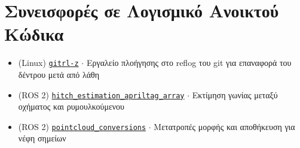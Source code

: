 \documentclass[a4paper,10pt,twoside]{article}
\begin{document}
\verticalspacebetweensections

\section{\textbf{Συνεισφορές σε Λογισμικό Ανοικτού Κώδικα}}\verticalspacebetweensectionandcontent

  \noindent\begin{minipage}[t]{\textwidth}
    \begin{itemize}
      \item (Linux) \href{https://github.com/li9i/gitrl-z}{\texttt{gitrl-z}} $\cdot$ Εργαλείο πλοήγησης στο reflog του git για επαναφορά του δέντρου μετά από λάθη\verticalspaceafteritem
      \item (ROS 2) \href{https://index.ros.org/p/hitch_estimation_apriltag_array/#humble}{\texttt{hitch\_estimation\_apriltag\_array}} $\cdot$ Εκτίμηση γωνίας μεταξύ οχήματος και ρυμουλκούμενου\verticalspaceafteritem
      \item (ROS 2) \href{https://index.ros.org/r/pointcloud_conversions/#lyrical}{\texttt{pointcloud\_conversions}} $\cdot$ Μετατροπές μορφής και αποθήκευση για νέφη σημείων
    \end{itemize}
  \end{minipage} \\ [0.2em]

\verticalspacebetweensections

\end{document}
